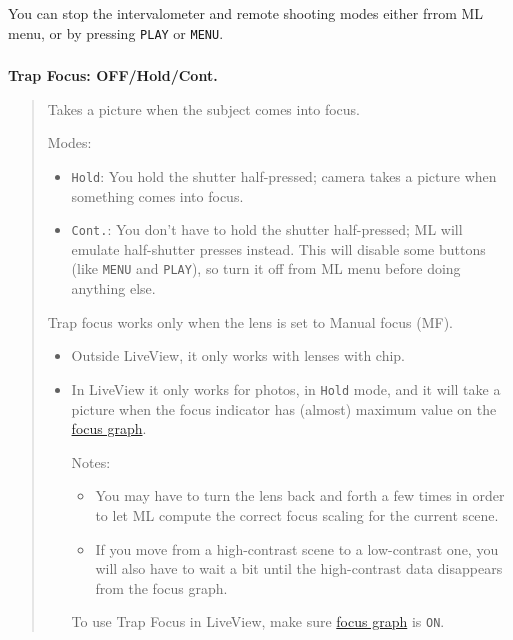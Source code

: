 \documentclass[a4paper,english]{article}
\begin{document}
You can stop the intervalometer and remote shooting modes either frrom ML menu, or by pressing \texttt{PLAY} or \texttt{MENU}.
\vspace{-10mm}\subsubsection*{}\label{trap-focus}
\textbf{Trap Focus: OFF/Hold/Cont.}
%
\begin{quote}

Takes a picture when the subject comes into focus.

Modes:
%
\begin{itemize}

\item \texttt{Hold}: You hold the shutter half-pressed; camera takes a picture when something comes into focus.

\item \texttt{Cont.}: You don't have to hold the shutter half-pressed; ML will emulate half-shutter presses instead. This will disable some buttons (like \texttt{MENU} and \texttt{PLAY}), so turn it off from ML menu before doing anything else.

\end{itemize}

Trap focus works only when the lens is set to Manual focus (MF).
%
\begin{itemize}

\item Outside LiveView, it only works with lenses with chip.

\item In LiveView it only works for photos, in \texttt{Hold} mode, and it will take a picture
when the focus indicator has (almost) maximum value on the \hyperref[focus-graph]{focus graph}.

Notes:
%
\begin{itemize}

\item You may have to turn the lens back and forth a few times in order to let ML
compute the correct focus scaling for the current scene.

\item If you move from a high-contrast scene to a low-contrast one, you will also have to wait a bit until the high-contrast data disappears from the focus graph.

\end{itemize}

To use Trap Focus in LiveView, make sure \hyperref[focus-graph]{focus graph} is \texttt{ON}.

\end{itemize}

\end{quote}
\end{document}

